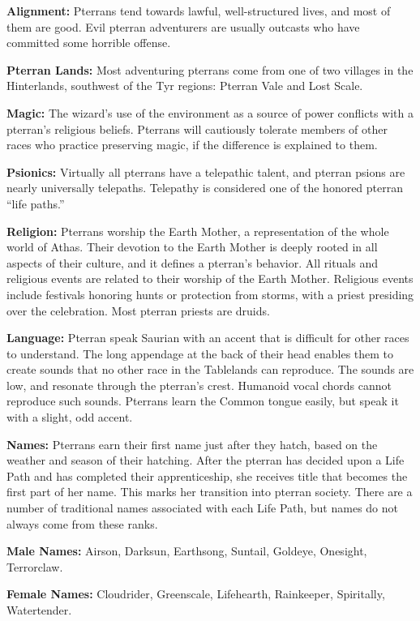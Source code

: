 \textbf{Alignment:} Pterrans tend towards lawful, well-structured lives, and most of them are good. Evil pterran adventurers are usually outcasts who have committed some horrible offense.

\textbf{Pterran Lands:} Most adventuring pterrans come from one of two villages in the Hinterlands, southwest of the Tyr regions: Pterran Vale and Lost Scale.

\textbf{Magic:} The wizard's use of the environment as a source of power conflicts with a pterran's religious beliefs. Pterrans will cautiously tolerate members of other races who practice preserving magic, if the difference is explained to them.

\textbf{Psionics:} Virtually all pterrans have a telepathic talent, and pterran psions are nearly universally telepaths. Telepathy is considered one of the honored pterran ``life paths.''

\textbf{Religion:} Pterrans worship the Earth Mother, a representation of the whole world of Athas. Their devotion to the Earth Mother is deeply rooted in all aspects of their culture, and it defines a pterran's behavior. All rituals and religious events are related to their worship of the Earth Mother. Religious events include festivals honoring hunts or protection from storms, with a priest presiding over the celebration. Most pterran priests are druids.

\textbf{Language:} Pterran speak Saurian with an accent that is difficult for other races to understand. The long appendage at the back of their head enables them to create sounds that no other race in the Tablelands can reproduce. The sounds are low, and resonate through the pterran's crest. Humanoid vocal chords cannot reproduce such sounds. Pterrans learn the Common tongue easily, but speak it with a slight, odd accent.

\textbf{Names:} Pterrans earn their first name just after they hatch, based on the weather and season of their hatching. After the pterran has decided upon a Life Path and has completed their apprenticeship, she receives title that becomes the first part of her name. This marks her transition into pterran society. There are a number of traditional names associated with each Life Path, but names do not always come from these ranks.

\textbf{Male Names:} Airson, Darksun, Earthsong, Suntail, Goldeye, Onesight, Terrorclaw.

\textbf{Female Names:} Cloudrider, Greenscale, Lifehearth, Rainkeeper, Spiritally, Watertender.

